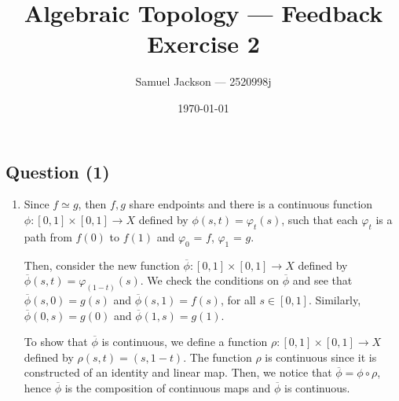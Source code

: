 \documentclass{article}
\title{Algebraic Topology  --- Feedback Exercise 2}
\author{Samuel Jackson --- 2520998j}
\date{\today}
\begin{document}
\maketitle

\newcommand{\zmod}[1]{\mathbb{Z}/#1\mathbb{Z}}
\newcommand{\zmodtwo}[2]{#1\mathbb{Z}/#2\mathbb{Z}}
\newcommand{\phibar}{\overline{\phi}}

\begin{center}
\section*{Question (1)}
\end{center}

\begin{flushleft}
    \begin{enumerate}[label=(\roman*)]
        \item Since $f \simeq g$, then $f,g$ share endpoints and there is a continuous function $\phi : [0,1] \times [0,1] \rightarrow X $ defined by $ \phi(s, t) = \varphi_t(s)$, such that each $\varphi_t$ is a path from $f(0)$ to $f(1)$ and $\varphi_0$ = $f$, $\varphi_1$ = $g$. \newline

        Then, consider the new function $\phibar : [0,1] \times [0,1] \rightarrow X $ defined by $\phibar(s, t) = \varphi_{(1-t)}(s)$. We check the conditions on $\phibar$ and see that $\phibar(s, 0) = g(s)$ and $\phibar(s,1) = f(s)$, for all $s \in [0,1]$. Similarly, $\phibar(0, s) = g(0)$ and $\phibar(1, s) = g(1)$. \newline

        To show that $\phibar$ is continuous, we define a function $\rho : [0,1] \times [0,1] \rightarrow X \, $ defined by $\rho(s, t) = (s, 1-t)$. The function $\rho$ is continuous since it is constructed of an identity and linear map. Then, we notice that $\phibar = \phi \circ \rho$, hence $\phibar$ is the composition of continuous maps and $\phibar$ is continuous.
        

\end{enumerate}
\end{flushleft}
\end{document}
